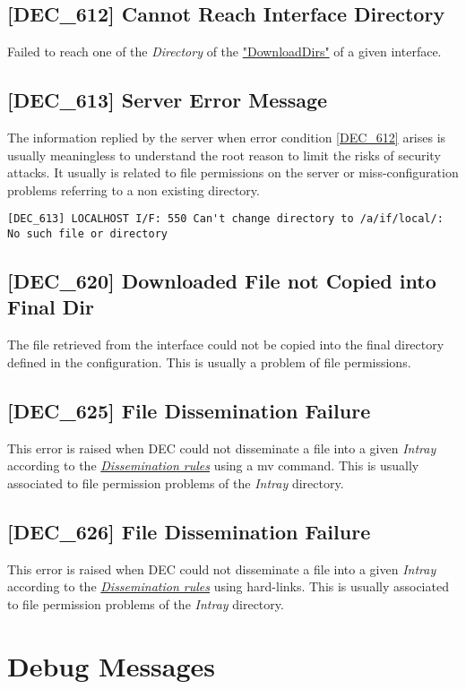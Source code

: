 \documentclass[dec_sum_main.tex]{subfiles}
\begin{document}
\subsection{[DEC\_612] Cannot Reach Interface Directory}
\label{DEC612}
Failed to reach one of the \textit{Directory} of the \hyperref[DownloadDirs]{"DownloadDirs"} of a given interface.

\subsection{[DEC\_613] Server Error Message }
The information replied by the server when error condition \hyperref[DEC612]{[DEC\_612]} arises is usually meaningless to understand the root reason to limit the risks of security attacks. It usually is related to file permissions on the server or miss-configuration problems referring to a non existing directory.
\begin{verbatim}
[DEC_613] LOCALHOST I/F: 550 Can't change directory to /a/if/local/: No such file or directory
\end{verbatim}

\subsection{[DEC\_620] Downloaded File not Copied into Final Dir}
\label{DEC620}
The file retrieved from the interface could not be copied into the final directory defined in the configuration. This is usually a problem of file permissions. 

\subsection{[DEC\_625] File Dissemination Failure}
\label{DEC625}
This error is raised when DEC could not disseminate a file into a given \textit{Intray} according to the \hyperref[Dissemination rules]{\textit{Dissemination rules}} using a mv command. This is usually associated to file permission problems of the \textit{Intray} directory.

\subsection{[DEC\_626] File Dissemination Failure}
\label{DEC625}
This error is raised when DEC could not disseminate a file into a given \textit{Intray} according to the \hyperref[Dissemination rules]{\textit{Dissemination rules}} using hard-links. This is usually associated to file permission problems of the \textit{Intray} directory.



\section{Debug Messages}
\end{document}
